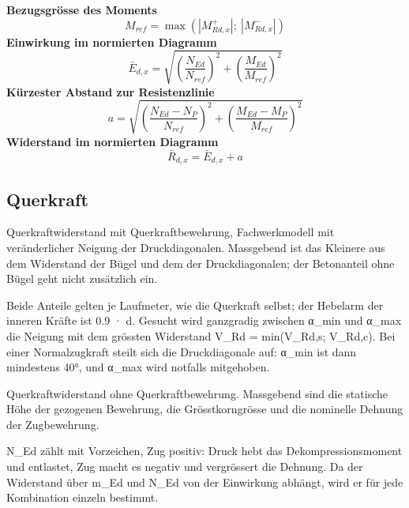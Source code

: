 \documentclass[11pt,a4paper]{article}
\begin{document}
\noindent\textbf{Bezugsgrösse des Moments}
\begin{equation*}
M_{ref} = \max\left(\left|M_{Rd,x}^{+}\right|;\ \left|M_{Rd,x}^{-}\right|\right)
\end{equation*}
\noindent\textbf{Einwirkung im normierten Diagramm}
\begin{equation*}
\bar{E}_{d,x} = \sqrt{\left(\frac{N_{Ed}}{N_{ref}}\right)^{2} + \left(\frac{M_{Ed}}{M_{ref}}\right)^{2}}
\end{equation*}
\noindent\textbf{Kürzester Abstand zur Resistenzlinie}
\begin{equation*}
a = \sqrt{\left(\frac{N_{Ed} - N_P}{N_{ref}}\right)^{2} + \left(\frac{M_{Ed} - M_P}{M_{ref}}\right)^{2}}
\end{equation*}
\noindent\textbf{Widerstand im normierten Diagramm}
\begin{equation*}
\bar{R}_{d,x} = \bar{E}_{d,x} + a
\end{equation*}
\subsection{Querkraft}
Querkraftwiderstand mit Querkraftbewehrung, Fachwerkmodell mit veränderlicher Neigung der Druckdiagonalen. Massgebend ist das Kleinere aus dem Widerstand der Bügel und dem der Druckdiagonalen; der Betonanteil ohne Bügel geht nicht zusätzlich ein.

Beide Anteile gelten je Laufmeter, wie die Querkraft selbst; der Hebelarm der inneren Kräfte ist 0.9 · d. Gesucht wird ganzgradig zwischen α\_min und α\_max die Neigung mit dem grössten Widerstand V\_Rd = min(V\_Rd,s; V\_Rd,c). Bei einer Normalzugkraft steilt sich die Druckdiagonale auf: α\_min ist dann mindestens 40°, und α\_max wird notfalls mitgehoben.

Querkraftwiderstand ohne Querkraftbewehrung. Massgebend sind die statische Höhe der gezogenen Bewehrung, die Grösstkorngrösse und die nominelle Dehnung der Zugbewehrung.

N\_Ed zählt mit Vorzeichen, Zug positiv: Druck hebt das Dekompressionsmoment und entlastet, Zug macht es negativ und vergrössert die Dehnung. Da der Widerstand über m\_Ed und N\_Ed von der Einwirkung abhängt, wird er für jede Kombination einzeln bestimmt.
\end{document}
